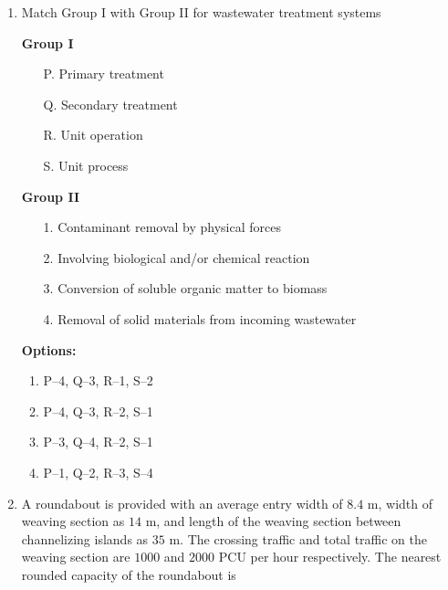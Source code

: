 \documentclass[journal]{IEEEtran}
\begin{document}
\begin{enumerate}
\item Match Group I  with Group II  for wastewater treatment systems \hfill {}

\begin{minipage}[t]{0.45\textwidth}
\textbf{Group I}
\begin{enumerate}[align=left]
    \item[P.] Primary treatment
    \item[Q.] Secondary treatment
    \item[R.] Unit operation
    \item[S.] Unit process
\end{enumerate}
\end{minipage}
\hfill
\begin{minipage}[t]{0.45\textwidth}
\textbf{Group II}
\begin{itemize}[align=left]
    \item[1.] Contaminant removal by physical forces
    \item[2.] Involving biological and/or chemical reaction
    \item[3.] Conversion of soluble organic matter to biomass
    \item[4.] Removal of solid materials from incoming wastewater
\end{itemize}
\end{minipage}


\textbf{Options:}
\begin{enumerate}
    \item P--4, Q--3, R--1, S--2
    \item P--4, Q--3, R--2, S--1
    \item P--3, Q--4, R--2, S--1
    \item P--1, Q--2, R--3, S--4
\end{enumerate}

\item A roundabout is provided with an average entry width of $8.4$ m, width of weaving section as $14$ m, and length of the weaving section between channelizing islands as $35$ m. The crossing traffic and total traffic on the weaving section are $1000$ and $2000$ PCU per hour respectively. The nearest rounded capacity of the roundabout  is \hfill {}
\begin{enumerate}
\end{enumerate}


\end{enumerate}
\end{document}
